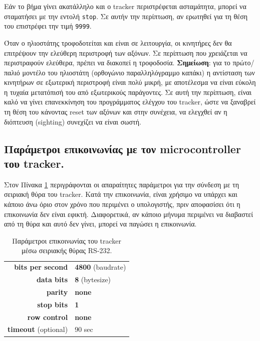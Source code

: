 \documentclass[
  a4paper,
  twoside,
  titlepage,
  12pt]{article}
\numberwithin{equation}{section}
\numberwithin{figure}{section}
\numberwithin{table}{section}
\begin{document}
Εάν το βήμα γίνει ακατάλληλο και ο tracker περιστρέφεται ασταμάτητα, μπορεί να σταματήσει με την εντολή \texttt{\textquotesingle{}stop\textquotesingle{}}.
Σε αυτήν την περίπτωση, αν ερωτηθεί για τη θέση του επιστρέφει την τιμή \texttt{\textquotesingle{}9999\textquotesingle{}}.

Όταν ο ηλιοστάτης τροφοδοτείται και είναι σε λειτουργία, οι κινητήρες δεν θα επιτρέψουν την ελεύθερη περιστροφή των αξόνων.
Σε περίπτωση που χρειάζεται να περιστραφούν ελεύθερα, πρέπει να διακοπεί η τροφοδοσία. \textbf{Σημείωση}: για το πρώτο/παλιό μοντέλο του ηλιοστάτη (ορθογώνιο παραλληλόγραμμο καπάκι) η αντίσταση των κινητήρων σε εξωτερική περιστροφή είναι πολύ μικρή, με αποτέλεσμα να είναι εύκολη η τυχαία μετατόπισή του από εξωτερικούς παράγοντες.
Σε αυτή την περίπτωση, είναι καλό να γίνει επανεκκίνηση του προγράμματος ελέγχου του tracker, ώστε να ξαναβρεί τη θέση του κάνοντας reset των αξόνων και στην συνέχεια, να ελεγχθεί αν η διόπτευση (sighting) συνεχίζει να είναι σωστή.

\hypertarget{ux3c0ux3b1ux3c1ux3acux3bcux3b5ux3c4ux3c1ux3bfux3b9-ux3b5ux3c0ux3b9ux3baux3bfux3b9ux3bdux3c9ux3bdux3afux3b1ux3c2-ux3bcux3b5-ux3c4ux3bfux3bd-microcontroller-ux3c4ux3bfux3c5-tracker.}{%
\subsection{Παράμετροι επικοινωνίας με τον microcontroller του tracker.}\label{ux3c0ux3b1ux3c1ux3acux3bcux3b5ux3c4ux3c1ux3bfux3b9-ux3b5ux3c0ux3b9ux3baux3bfux3b9ux3bdux3c9ux3bdux3afux3b1ux3c2-ux3bcux3b5-ux3c4ux3bfux3bd-microcontroller-ux3c4ux3bfux3c5-tracker.}}

Στον Πίνακα \ref{tab:trackerserial} περιγράφονται οι απαραίτητες παράμετροι για την σύνδεση με τη σειριακή θύρα του tracker. Κατά την επικοινωνία, είναι χρήσιμο να υπάρχει και κάποιο άνω όριο στον χρόνο που περιμένει ο υπολογιστής, πριν αποφασίσει ότι η επικοινωνία δεν είναι εφικτή. Διαφορετικά, αν κάποιο μήνυμα περιμένει να διαβαστεί από τη θύρα και αυτό δεν γίνει, μπορεί να παγώσει η επικοινωνία.

\footnotesize

\begin{longtable}[]{@{}rl@{}}
\caption{\label{tab:trackerserial} Παράμετροι επικοινωνίας του tracker μέσω σειριακής θύρας RS-232.}\tabularnewline
\toprule()
\endhead
\textbf{bits per second} & \textbf{4800} (baudrate) \\
\textbf{data bits} & \textbf{8} (bytesize) \\
\textbf{parity} & \textbf{none} \\
\textbf{stop bits} & \textbf{1} \\
\textbf{row control} & \textbf{none} \\
\textbf{timeout} (optional) & 90 sec \\
\bottomrule()
\end{longtable}
\end{document}
